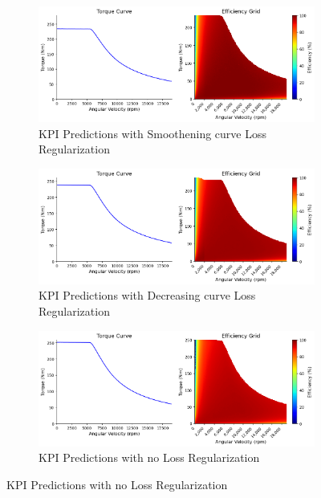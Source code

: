 \documentclass{report} %
\begin{document}
\begin{figure}[H]\ContinuedFloat
    \centering
    \begin{subfigure}{1\textwidth}
        \centering
        \includegraphics[width=1\textwidth]{./ReportImages/predictions_Smoothening.png} 
        \caption{KPI Predictions with Smoothening curve Loss Regularization} 
        \label{KPI_Predictions_with_Smoothening}
    \end{subfigure}
    \begin{subfigure}{1\textwidth}
        \centering
        \includegraphics[width=1\textwidth]{./ReportImages/predictions_Decreasing.png} 
        \caption{KPI Predictions with Decreasing curve Loss Regularization} 
        \label{KPI_Predictions_with_Decreasing}
    \end{subfigure}\hfill
    \begin{subfigure}{1\textwidth}
        \centering
        \includegraphics[width=1\textwidth]{./ReportImages/predictions_no_lossreg.png} 
        \caption{KPI Predictions with no Loss Regularization} 
        \label{KPI_Predictions_with_No_Loss}
    \end{subfigure}\hfill
\end{figure}
\end{document}
